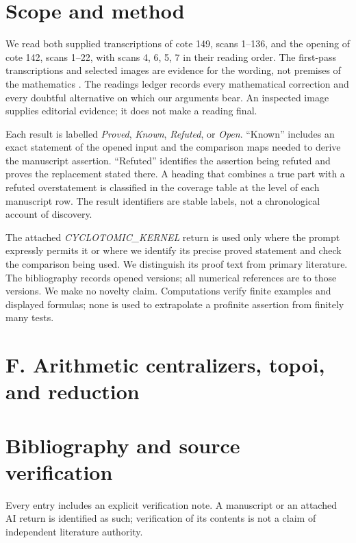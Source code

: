 \documentclass[11pt,a4paper]{article}
\newcounter{result}
\begin{document}
\section*{Scope and method}
We read both supplied transcriptions of cote 149, scans 1--136, and the
opening of cote 142, scans 1--22, with scans 4, 6, 5, 7 in their reading
order. The first-pass transcriptions and selected images are evidence
for the wording, not premises of the mathematics
\cite{Manuscript149,Manuscript142}. The readings ledger records every
mathematical correction and every doubtful alternative on which our
arguments bear. An inspected image supplies editorial evidence; it does
not make a reading final.

Each result is labelled \emph{Proved}, \emph{Known}, \emph{Refuted}, or
\emph{Open}. ``Known'' includes an exact statement of the opened input
and the comparison maps needed to derive the manuscript assertion.
``Refuted'' identifies the assertion being refuted and proves the
replacement stated there. A heading that combines a true part with a
refuted overstatement is classified in the coverage table at the level
of each manuscript row. The result identifiers are stable labels,
not a chronological account of discovery.

The attached \emph{CYCLOTOMIC\_KERNEL} return is used only where the
prompt expressly permits it or where we identify its precise proved
statement and check the comparison being used. We distinguish its proof
text from primary literature. The bibliography records opened versions;
all numerical references are to those versions. We make no novelty
claim. Computations verify finite examples and displayed formulas; none
is used to extrapolate a profinite assertion from finitely many tests.

\begingroup
\small\setlength{\parskip}{0pt}
\tableofcontents
\endgroup
\clearpage

\clearpage

\clearpage

\clearpage
\section{F. Arithmetic centralizers, topoi, and reduction}



\clearpage




\clearpage
\section*{Bibliography and source verification}
Every entry includes an explicit verification note. A manuscript or an
attached AI return is identified as such; verification of its contents
is not a claim of independent literature authority.
{\small}
\end{document}
